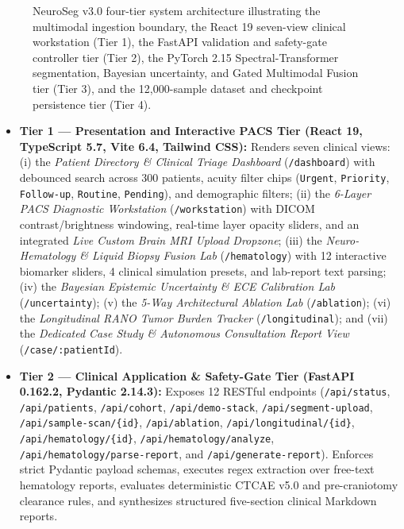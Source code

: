 \documentclass[conference]{IEEEtran}
\begin{document}
\begin{figure}[t]
\caption{NeuroSeg v3.0 four-tier system architecture illustrating the multimodal ingestion boundary, the React 19 seven-view clinical workstation (Tier 1), the FastAPI validation and safety-gate controller tier (Tier 2), the PyTorch 2.15 Spectral-Transformer segmentation, Bayesian uncertainty, and Gated Multimodal Fusion tier (Tier 3), and the 12,000-sample dataset and checkpoint persistence tier (Tier 4).}
\label{fig:arch}
\end{figure}

\begin{itemize}
    \item \textbf{Tier 1 --- Presentation and Interactive PACS Tier (React 19, TypeScript 5.7, Vite 6.4, Tailwind CSS):} Renders seven clinical views: (i) the \textit{Patient Directory \& Clinical Triage Dashboard} (\texttt{/dashboard}) with debounced search across 300 patients, acuity filter chips (\texttt{Urgent}, \texttt{Priority}, \texttt{Follow-up}, \texttt{Routine}, \texttt{Pending}), and demographic filters; (ii) the \textit{6-Layer PACS Diagnostic Workstation} (\texttt{/workstation}) with DICOM contrast/brightness windowing, real-time layer opacity sliders, and an integrated \textit{Live Custom Brain MRI Upload Dropzone}; (iii) the \textit{Neuro-Hematology \& Liquid Biopsy Fusion Lab} (\texttt{/hematology}) with 12 interactive biomarker sliders, 4 clinical simulation presets, and lab-report text parsing; (iv) the \textit{Bayesian Epistemic Uncertainty \& ECE Calibration Lab} (\texttt{/uncertainty}); (v) the \textit{5-Way Architectural Ablation Lab} (\texttt{/ablation}); (vi) the \textit{Longitudinal RANO Tumor Burden Tracker} (\texttt{/longitudinal}); and (vii) the \textit{Dedicated Case Study \& Autonomous Consultation Report View} (\texttt{/case/:patientId}).
    \item \textbf{Tier 2 --- Clinical Application \& Safety-Gate Tier (FastAPI 0.162.2, Pydantic 2.14.3):} Exposes 12 RESTful endpoints (\texttt{/api/status}, \texttt{/api/patients}, \texttt{/api/cohort}, \texttt{/api/demo-stack}, \texttt{/api/segment-upload}, \texttt{/api/sample-scan/\{id\}}, \texttt{/api/ablation}, \texttt{/api/longitudinal/\{id\}}, \texttt{/api/hematology/\{id\}}, \texttt{/api/hematology/analyze}, \texttt{/api/hematology/parse-report}, and \texttt{/api/generate-report}). Enforces strict Pydantic payload schemas, executes regex extraction over free-text hematology reports, evaluates deterministic CTCAE v5.0 and pre-craniotomy clearance rules, and synthesizes structured five-section clinical Markdown reports.

\end{itemize}
\end{document}

